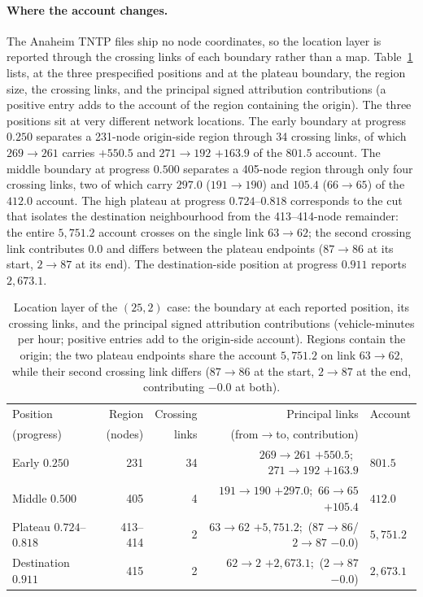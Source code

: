\paragraph{Where the account changes.}
The Anaheim TNTP files ship no node coordinates, so the location layer
is reported through the crossing links of each boundary rather than a
map. Table~\ref{tab:anaheimcrossing} lists, at the three prespecified
positions and at the plateau boundary, the region size, the crossing
links, and the principal signed attribution contributions (a positive
entry adds to the account of the region containing the origin). The
three positions sit at very different network locations. The early
boundary at progress $0.250$ separates a 231-node origin-side region
through 34 crossing links, of which $269\!\to\!261$ carries $+550.5$
and $271\!\to\!192$ $+163.9$ of the $801.5$ account. The middle
boundary at progress $0.500$ separates a 405-node region through only
four crossing links, two of which carry $297.0$ ($191\!\to\!190$) and
$105.4$ ($66\!\to\!65$) of the $412.0$ account. The high plateau at
progress $0.724$--$0.818$ corresponds to the cut that isolates the
destination neighbourhood from the 413--414-node remainder: the entire
$5{,}751.2$ account crosses on the single link $63\!\to\!62$; the second
crossing link contributes $0.0$ and differs between the plateau
endpoints ($87\!\to\!86$ at its start, $2\!\to\!87$ at its end). The
destination-side position at progress $0.911$ reports $2{,}673.1$.
\begin{table}[t]\centering\footnotesize
\caption{Location layer of the $(25,2)$ case: the boundary at each
reported position, its crossing links, and the principal signed
attribution contributions (vehicle-minutes per hour; positive entries
add to the origin-side account). Regions contain the origin; the two
plateau endpoints share the account $5{,}751.2$ on link $63\!\to\!62$,
while their second crossing link differs ($87\!\to\!86$ at the start,
$2\!\to\!87$ at the end, contributing $-0.0$ at both).}\label{tab:anaheimcrossing}
\setlength{\tabcolsep}{4pt}
\begin{tabular*}{\tblwidth}{@{\extracolsep{\fill}}lrrrl}
\toprule
Position & Region & Crossing & Principal links & Account\\
(progress) & (nodes) & links & (from$\to$to, contribution) &\\
\midrule
Early $0.250$ & 231 & 34 & $269\!\to\!261$ $+550.5$;\ $271\!\to\!192$ $+163.9$ & $801.5$\\
Middle $0.500$ & 405 & 4 & $191\!\to\!190$ $+297.0$;\ $66\!\to\!65$ $+105.4$ & $412.0$\\
Plateau $0.724$--$0.818$ & 413--414 & 2 & $63\!\to\!62$ $+5{,}751.2$;\ ($87\!\to\!86$/$2\!\to\!87$ $-0.0$) & $5{,}751.2$\\
Destination $0.911$ & 415 & 2 & $62\!\to\!2$ $+2{,}673.1$;\ ($2\!\to\!87$ $-0.0$) & $2{,}673.1$\\
\bottomrule\end{tabular*}\end{table}

